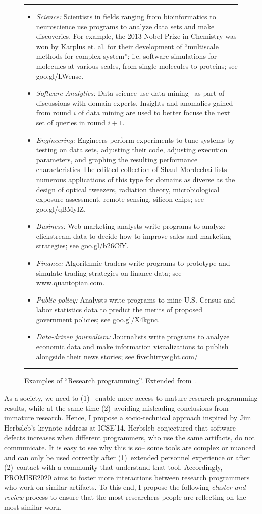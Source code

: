 \documentclass[journal]{IEEEtran}
\newcommand{\bi}{\begin{itemize}}
\newcommand{\ei}{\end{itemize}}
\begin{document}
\begin{figure}[!t]
\small
\hrule

\bi
\item 
{\em Science:} Scientists in fields ranging from bioinformatics to neuroscience use programs to analyze data sets and make  discoveries.
For example, the 2013 Nobel Prize in Chemistry was won by Karplus et. al. for their development of ``multiscale methods for complex system'';
i.e. software simulations for molecules at various scales, from single molecules to proteins; see goo.gl/LWensc.
\item
{\em Software Analytics:} Data science use data mining~\cite{me12d}
as part of discussions with domain experts. Insights and anomalies gained from round $i$ of data mining are used to
better focuse the next set of queries in round $i+1$.
\item
{\em Engineering:} Engineers perform experiments to tune systems by testing on data sets, adjusting their code, adjusting execution parameters, and graphing the resulting performance characteristics The editted collection of Shaul Mordechai lists numerous applications of this type for domains as diverse as the design of optical tweezers, radiation theory, microbiological exposure assessment, remote sensing, silicon chips; see  goo.gl/qBMyIZ.
\item
{\em Business:} Web marketing analysts write programs to analyze clickstream data to decide how to improve sales and marketing strategies; see  goo.gl/b26CfY.
\item
{\em Finance:} Algorithmic traders write programs to prototype and simulate  trading strategies on finance data; see  www.quantopian.com.
\item
{\em Public policy:} Analysts write programs to mine U.S. Census and labor statistics data to predict the merits of proposed government policies; see goo.gl/X4kgnc.
\item
{\em Data-driven journalism: }Journalists write programs to analyze economic data and make information visualizations to publish alongside their news stories; 
see fivethirtyeight.com/
\ei
\hrule
\caption{Examples of ``Research programming''.
Extended 
from~\cite{guo12}.}\label{fig:eg}
\end{figure}

As a society,     we need  to (1)~ enable more access to mature  research programming results, while at the same
time (2)~avoiding   misleading conclusions from immature research.
Hence, I propose a socio-technical approach inspired by  Jim Herbsleb's
keynote address at  ICSE'14.
Herbsleb conjectured  that software defects increases when different  programmers, who use the same artifacts, do not communicate.  It is easy to
see why this is so-- some tools are complex or nuanced and can only be used correctly after (1)~extended personnel experience or after (2)~contact with a community
that understand that tool. Accordingly, PROMISE2020 aims to foster
more interactions between research programmers who work on similar artifacts.
To this end, I propose the following {\em cluster and review} process to ensure that the
 most researchers people are reflecting on the most similar work.
\end{document}
